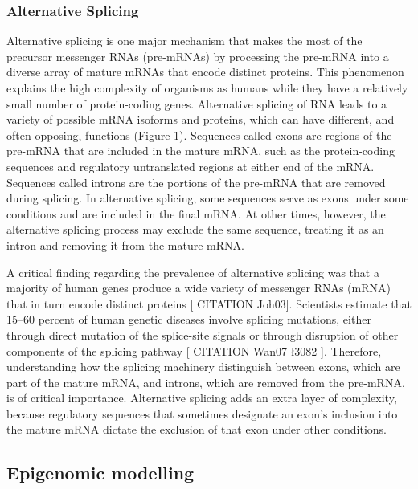 \subsubsection{Alternative Splicing}

Alternative splicing is one major mechanism that makes the most of the precursor messenger RNAs (pre-mRNAs) by processing the pre-mRNA into a diverse array of mature mRNAs that encode distinct proteins. This phenomenon explains the high complexity of organisms as humans while they have a relatively small number of protein-coding genes. Alternative splicing of RNA leads to a variety of possible mRNA isoforms and proteins, which can have different, and often opposing, functions (Figure 1). Sequences called exons are regions of the pre-mRNA that are included in the mature mRNA, such as the protein-coding sequences and regulatory untranslated regions at either end of the mRNA. Sequences called introns are the portions of the pre-mRNA that are removed during splicing. In alternative splicing, some sequences serve as exons under some conditions and are included in the final mRNA. At other times, however, the alternative splicing process may exclude the same sequence, treating it as an intron and removing it from the mature mRNA.

\medskip

A critical finding regarding the prevalence of alternative splicing was that a majority of human genes produce a wide variety of messenger RNAs (mRNA) that in turn encode distinct proteins [ CITATION Joh03]. Scientists estimate that 15–60 percent of human genetic diseases involve splicing mutations, either through direct mutation of the splice-site signals or through disruption of other components of the splicing pathway [ CITATION Wan07 \l 3082 ]. Therefore, understanding how the splicing machinery distinguish between exons, which are part of the mature mRNA, and introns, which are removed from the pre-mRNA, is of critical importance. Alternative splicing adds an extra layer of complexity, because regulatory sequences that sometimes designate an exon's inclusion into the mature mRNA dictate the exclusion of that exon under other conditions.


\subsection{Epigenomic modelling}

